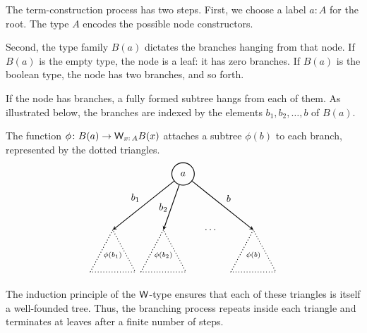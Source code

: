 The term-construction process has two steps. First, we choose a label $a\colon A$ for the root. The type $A$ encodes the possible node constructors.

Second, the type family $B(a)$ dictates the branches hanging from that node. If $B(a)$ is the empty type, the node is a leaf: it has zero branches. If $B(a)$ is the boolean type, the node has two branches, and so forth. 

If the node has branches, a fully formed subtree hangs from each of them. As illustrated below, the branches are indexed by the elements $b_1,b_2,\dots,b$ of $B(a)$.

The function $\phi\colon B(a)\to\fun W_{x\colon A}B(x)$ attaches a subtree $\phi(b)$ to each branch, represented by the dotted triangles.
\begin{equation}\label{tik:W-tree}
    \begin{tikzpicture}[>=stealth, thick]
        \node[circle, draw, minimum size=8mm] (a) at (0,0) {$a$};
    
        \coordinate (t1) at (-2.5, -2);
        \coordinate (t2) at (-0.7, -2);
        \coordinate (tb) at (2.5, -2);
    
        \draw[->] (a) -- node[above left] {$b_1$} (t1);
        \draw[->] (a) -- node[left] {$b_2$} (t2);
        \draw[->] (a) -- node[above right] {$b$} (tb);
    
        \node at (1, -2) {$\cdots$};
    
        \draw[dotted, thick] (t1) -- ++(-0.8, -1.5) -- ++(1.6, 0) -- cycle;
        \node at (-2.5, -2.9) {$\scriptstyle\phi(b_1)$};
    
        \draw[dotted, thick] (t2) -- ++(-0.8, -1.5) -- ++(1.6, 0) -- cycle;
        \node at (-0.7, -2.9) {$\scriptstyle\phi(b_2)$};
    
        \draw[dotted, thick] (tb) -- ++(-0.8, -1.5) -- ++(1.6, 0) -- cycle;
        \node at (2.5, -2.9) {$\scriptstyle\phi(b)$};
    \end{tikzpicture}    
\end{equation}

The induction principle of the $\mathsf{W}$-type ensures that each of these triangles is itself a well-founded tree. Thus, the branching process repeats inside each triangle and terminates at leaves after a finite number of steps.

